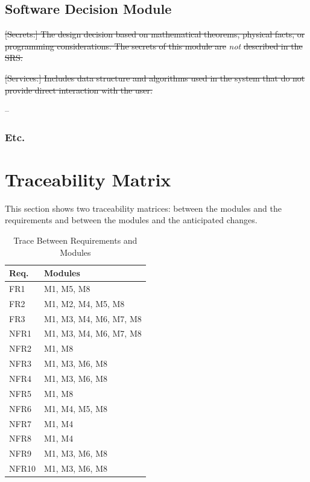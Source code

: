 \documentclass[12pt, titlepage]{article}
\begin{document}
\subsection{Software Decision Module}

\begin{description}
\item\sout{[Secrets:] The design decision based on mathematical theorems, physical
  facts, or programming considerations. The secrets of this module are}
  \emph{not} \sout{described in the SRS.}
\item\sout{[Services:] Includes data structure and algorithms used in the system that
  do not provide direct interaction with the user. }
\item[Implemented By:] --
\end{description}
\subsubsection{Etc.}


\section{Traceability Matrix} \label{SecTM}

This section shows two traceability matrices: between the modules and the
requirements and between the modules and the anticipated changes.

\begin{table}[H]
\centering
\begin{tabular}{p{} p{}}
\toprule
\textbf{Req.} & \textbf{Modules}\\
\midrule
FR1 & M1, M5, M8\\
FR2 & M1, M2, M4, M5, M8\\
FR3 & M1, M3, M4, M6, M7, M8\\

NFR1 & M1, M3, M4, M6, M7, M8\\
NFR2 & M1, M8\\
NFR3 & M1, M3, M6, M8\\
NFR4 & M1, M3, M6, M8\\
NFR5 & M1, M8\\
NFR6 & M1, M4, M5, M8\\
NFR7 & M1, M4\\
NFR8 & M1, M4\\
NFR9 & M1, M3, M6, M8\\
NFR10 &  M1, M3, M6, M8\\

\bottomrule
\end{tabular}
\caption{Trace Between Requirements and Modules}
\label{TblRT}
\end{table}
\end{document}
